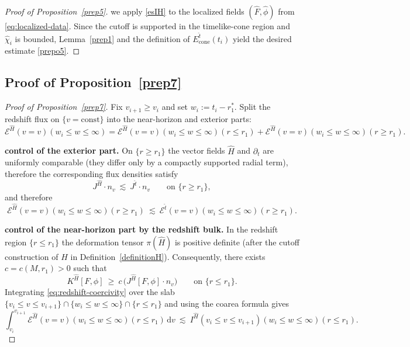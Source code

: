 \documentclass[11pt]{article}
\numberwithin{equation}{section}
\theoremstyle{plain}
\theoremstyle{definition}
\theoremstyle{remark}
\newcommand{\dd}{\mathrm{d}}
\begin{document}
\begin{proof}[Proof of Proposition~\ref{prep5}]
\medskip
we apply \eqref{esIH} to the localized fields $(\hat F,\hat\phi)$ from \eqref{eq:localized-data}.
Since the cutoff is supported in the timelike-cone region and $\hat\chi_i$ is bounded, Lemma~\ref{prep1} and the definition of $E^{\hat t}_{\mathrm{cone}}(t_i)$ yield the desired estimate \eqref{prepo5}.
\end{proof}

\subsection{Proof of Proposition~\ref{prep7}}
\label{app:proof-prep7}

\begin{proof}[Proof of Proposition~\ref{prep7}]
Fix $v_{i+1}\ge v_i$ and set $w_i:=t_i-r_1^{\ast}$.
Split the redshift flux on $\{v=\mathrm{const}\}$ into the near-horizon and exterior parts:
\begin{equation}
\mathcal E^{\hat H}(v=v)(w_i\le w\le\infty)
=
\mathcal E^{\hat H}(v=v)(w_i\le w\le\infty)(r\le r_1)
+
\mathcal E^{\hat H}(v=v)(w_i\le w\le\infty)(r\ge r_1).
\end{equation}

\smallskip
\noindent\textbf{control of the exterior part.}
On $\{r\ge r_1\}$ the vector fields $\hat H$ and $\partial_t$ are uniformly comparable (they differ only by a compactly supported radial term), therefore the corresponding flux densities satisfy
\begin{equation}
J^{\hat H}\cdot n_{v}\ \lesssim\ J^{\hat t}\cdot n_{v}
\qquad\text{on }\{r\ge r_1\},
\end{equation}
and therefore
\begin{equation}\label{eq:prep7-exterior}
\mathcal E^{\hat H}(v=v)(w_i\le w\le\infty)(r\ge r_1)
\ \lesssim\ \mathcal E^{\hat t}(v=v)(w_i\le w\le\infty)(r\ge r_1).
\end{equation}

\smallskip
\noindent\textbf{control of the near-horizon part by the redshift bulk.}
In the redshift region $\{r\le r_1\}$ the deformation tensor $\pi(\hat H)$ is positive definite (after the cutoff construction of $\hat H$ in Definition~\ref{definitionH}).
Consequently, there exists $c=c(M,r_1)>0$ such that
\begin{equation}\label{eq:redshift-coercivity}
K^{\hat H}[F,\phi]\ \ge\ c\,\bigl(J^{\hat H}[F,\phi]\cdot n_{v}\bigr)
\qquad\text{on }\{r\le r_1\}.
\end{equation}
Integrating \eqref{eq:redshift-coercivity} over the slab $\{v_i\le v\le v_{i+1}\}\cap\{w_i\le w\le\infty\}\cap\{r\le r_1\}$ and using the coarea formula gives
\begin{equation}\label{eq:prep7-near}
\int_{v_i}^{v_{i+1}}\mathcal E^{\hat H}(v=v)(w_i\le w\le\infty)(r\le r_1)\,\dd v
\ \lesssim\ I^{\hat H}(v_i\le v\le v_{i+1})(w_i\le w\le\infty)(r\le r_1).
\end{equation}


\end{proof}
\end{document}
